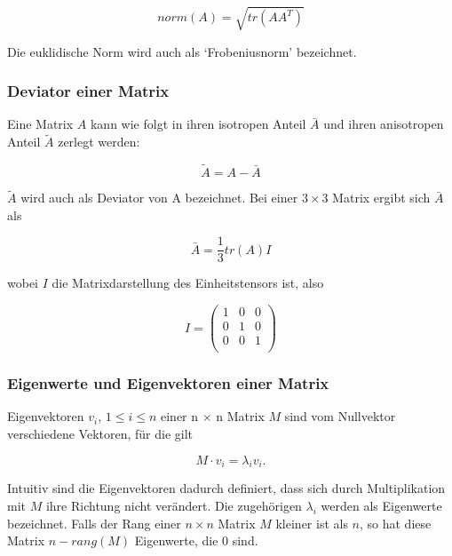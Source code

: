 \documentclass[a4paper,fontsize=12pt,toc=bib,halfparskip]{scrartcl}
\begin{document}
\begin{equation}
	norm(A) = \sqrt{tr(AA^T)}
\end{equation}

Die euklidische Norm wird auch als `Frobeniusnorm' bezeichnet.

\subsubsection{Deviator einer Matrix}
Eine Matrix $A$ kann wie folgt in ihren isotropen Anteil $\bar{A}$ und ihren anisotropen Anteil $\tilde{A}$ zerlegt werden:

\begin{equation}
\tilde{A} = A - \bar{A}
\end{equation}

$\tilde{A}$ wird auch als Deviator von A bezeichnet. Bei einer $3\times 3$ Matrix ergibt sich $\bar{A}$ als

\begin{equation}
\bar{A} = \frac{1}{3}tr(A)I
\end{equation}

wobei $I$ die Matrixdarstellung des Einheitstensors ist, also

\begin{equation}
	I = 	
	\begin{pmatrix}
		1 & 0 & 0 \\
		0 & 1 & 0 \\
		0 & 0 & 1 \\
	\end{pmatrix}
\end{equation}

\subsubsection{Eigenwerte und Eigenvektoren einer Matrix}

Eigenvektoren $v_i$, $1\leq i\leq n$ einer n $\times$ n Matrix $M$ sind vom Nullvektor verschiedene Vektoren, f\"ur die gilt

\begin{equation}
	M \cdot v_i = \lambda_i v_i.
\end{equation}

Intuitiv sind die Eigenvektoren dadurch definiert, dass sich durch Multiplikation mit $M$ ihre Richtung nicht ver\"andert. Die zugeh\"origen $\lambda_i$ werden als Eigenwerte bezeichnet.
Falls der Rang einer $n\times n$ Matrix $M$ kleiner ist als $n$, so hat diese Matrix $n - rang(M)$ Eigenwerte, die 0 sind.
\end{document}
